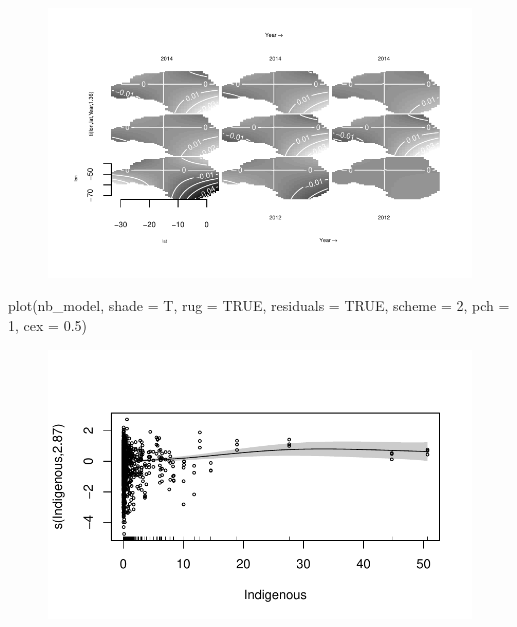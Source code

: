 \documentclass[
  letterpaper,
  DIV=11,
  numbers=noendperiod]{scrartcl}
\newenvironment{Shaded}{\begin{snugshade}}{\end{snugshade}}
\newcommand{\AttributeTok}[1]{\textcolor[rgb]{0.40,0.45,0.13}{#1}}
\newcommand{\ConstantTok}[1]{\textcolor[rgb]{0.56,0.35,0.01}{#1}}
\newcommand{\DecValTok}[1]{\textcolor[rgb]{0.68,0.00,0.00}{#1}}
\newcommand{\FloatTok}[1]{\textcolor[rgb]{0.68,0.00,0.00}{#1}}
\newcommand{\FunctionTok}[1]{\textcolor[rgb]{0.28,0.35,0.67}{#1}}
\newcommand{\NormalTok}[1]{\textcolor[rgb]{0.00,0.23,0.31}{#1}}
\begin{document}
\begin{figure}[H]

{\centering \includegraphics{Group34Coursework_files/figure-pdf/unnamed-chunk-16-12.pdf}

}

\end{figure}

\begin{Shaded}
\begin{Highlighting}[]
\FunctionTok{plot}\NormalTok{(nb\_model, }\AttributeTok{shade =}\NormalTok{ T, }\AttributeTok{rug =} \ConstantTok{TRUE}\NormalTok{, }\AttributeTok{residuals =} \ConstantTok{TRUE}\NormalTok{, }\AttributeTok{scheme =} \DecValTok{2}\NormalTok{, }\AttributeTok{pch =} \DecValTok{1}\NormalTok{,}
    \AttributeTok{cex =} \FloatTok{0.5}\NormalTok{)}
\end{Highlighting}
\end{Shaded}

\begin{figure}[H]

{\centering \includegraphics{Group34Coursework_files/figure-pdf/unnamed-chunk-17-1.pdf}

}

\end{figure}
\end{document}
